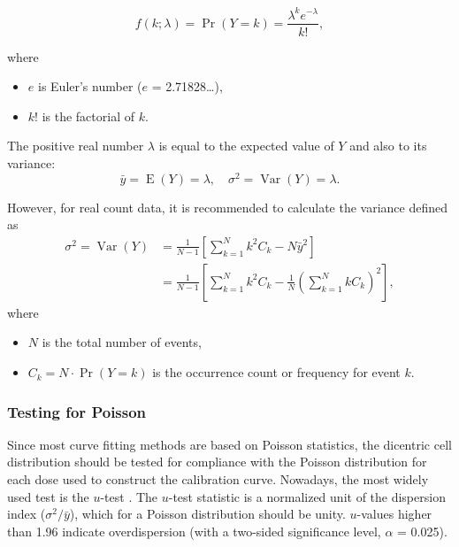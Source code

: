 \documentclass[]{scrartcl}
\providecommand{\tightlist}{%
  \setlength{\itemsep}{0pt}\setlength{\parskip}{0pt}}
\begin{document}
\begin{equation}
    f(k; \lambda) = \Pr(Y = k)= \frac{\lambda^k e^{-\lambda}}{k!},
    \label{eq:poisson-dist}
\end{equation}

where

\begin{itemize}
\tightlist
\item
  \(e\) is Euler's number (\(e\) = 2.71828\ldots),
\item
  \(k\)! is the factorial of \(k\).
\end{itemize}

The positive real number \(\lambda\) is equal to the expected value of \(Y\) and also to its variance:
\begin{equation}
    \bar{y} = \operatorname{E}(Y) = \lambda, \quad \sigma^{2} = \operatorname{Var}(Y) = \lambda.
    \label{eq:variance-poisson}
\end{equation}

However, for real count data, it is recommended to calculate the variance defined as
\begin{equation}
\begin{aligned}
  \sigma^{2} = \operatorname{Var}(Y)
  &= \frac{1}{N - 1} \left[ \sum_{k=1}^{N} k^{2} C_{k} - N \bar{y}^{2} \right] \\
  &= \frac{1}{N - 1} \left[  \sum_{k=1}^{N} k^{2} C_{k} - \frac{1}{N} \left( \sum_{k=1}^{N} k C_{k} \right)^{2} \right]
  ,
\end{aligned}
  \label{eq:variance}
\end{equation}
where

\begin{itemize}
\tightlist
\item
  \(N\) is the total number of events,
\item
  \(C_{k} = N \cdot \Pr(Y = k)\) is the occurrence count or frequency for event \(k\).
\end{itemize}

\hypertarget{testing-for-poisson}{%
\subsubsection{Testing for Poisson}\label{testing-for-poisson}}

Since most curve fitting methods are based on Poisson statistics, the dicentric cell distribution should be tested for compliance with the Poisson distribution for each dose used to construct the calibration curve. Nowadays, the most widely used test is the \(u\)-test \citep{Rao1956, Savage1970}. The \(u\)-test statistic is a normalized unit of the dispersion index (\(\sigma^{2}/\bar{y}\)), which for a Poisson distribution should be unity. \(u\)-values higher than 1.96 indicate overdispersion (with a two-sided significance level, \(\alpha\) = 0.025).
\end{document}
